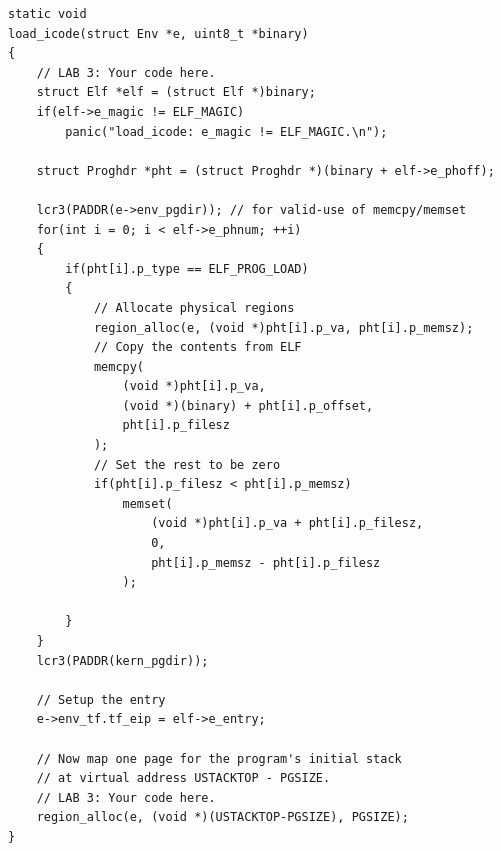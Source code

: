 \documentclass[12pt, letterpaper]{report}
\begin{document}
\newpage
\quad \par 
\lstset{style=CStyle}
\setmainfont{Consolas}
\begin{lstlisting}
static void
load_icode(struct Env *e, uint8_t *binary)
{
    // LAB 3: Your code here.
    struct Elf *elf = (struct Elf *)binary;
    if(elf->e_magic != ELF_MAGIC)
        panic("load_icode: e_magic != ELF_MAGIC.\n");

    struct Proghdr *pht = (struct Proghdr *)(binary + elf->e_phoff);

    lcr3(PADDR(e->env_pgdir)); // for valid-use of memcpy/memset
    for(int i = 0; i < elf->e_phnum; ++i)
    {
        if(pht[i].p_type == ELF_PROG_LOAD)
        {
            // Allocate physical regions
            region_alloc(e, (void *)pht[i].p_va, pht[i].p_memsz);
            // Copy the contents from ELF
            memcpy(
                (void *)pht[i].p_va, 
                (void *)(binary) + pht[i].p_offset,
                pht[i].p_filesz
            );
            // Set the rest to be zero
            if(pht[i].p_filesz < pht[i].p_memsz)
                memset(
                    (void *)pht[i].p_va + pht[i].p_filesz,
                    0,
                    pht[i].p_memsz - pht[i].p_filesz
                );
            
        }
    }
    lcr3(PADDR(kern_pgdir));

    // Setup the entry
    e->env_tf.tf_eip = elf->e_entry;	

    // Now map one page for the program's initial stack
    // at virtual address USTACKTOP - PGSIZE.
    // LAB 3: Your code here.
    region_alloc(e, (void *)(USTACKTOP-PGSIZE), PGSIZE);
}
\end{lstlisting}
\setmainfont{Times New Roman}

\newpage
\end{document}
